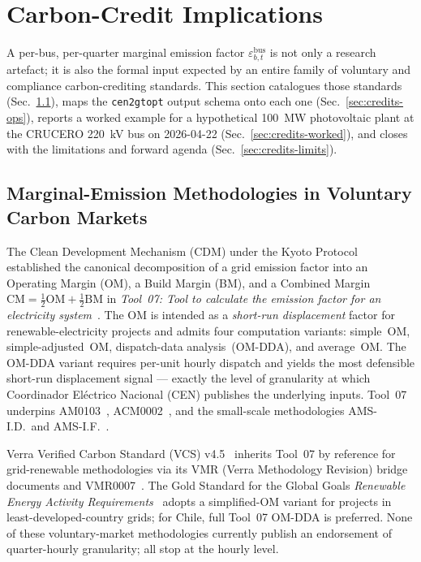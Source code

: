 \section{Carbon-Credit Implications}
\label{sec:credits}

A per-bus, per-quarter marginal emission factor
$\varepsilon^{\mathrm{bus}}_{b,t}$ is not only a research artefact; it
is also the formal input expected by an entire family of voluntary and
compliance carbon-crediting standards.  This section catalogues those
standards (Sec.~\ref{sec:credits-lit}), maps the
\texttt{cen2gtopt} output schema onto each one
(Sec.~\ref{sec:credits-ops}), reports a worked example for a
hypothetical 100~MW photovoltaic plant at the CRUCERO 220~kV bus on
2026-04-22 (Sec.~\ref{sec:credits-worked}), and closes with the
limitations and forward agenda
(Sec.~\ref{sec:credits-limits}).

\subsection{Marginal-Emission Methodologies in Voluntary Carbon Markets}
\label{sec:credits-lit}

The Clean Development Mechanism (CDM) under the Kyoto Protocol
established the canonical decomposition of a grid emission factor
into an Operating Margin (OM), a Build Margin (BM), and a Combined
Margin
$\mathrm{CM}=\tfrac{1}{2}\mathrm{OM}+\tfrac{1}{2}\mathrm{BM}$ in
\textit{Tool~07: Tool to calculate the emission factor for an
electricity system}~\cite{UNFCCCTool07}.  The OM is intended as a
\emph{short-run displacement} factor for renewable-electricity
projects and admits four computation variants: simple~OM,
simple-adjusted~OM, dispatch-data analysis~(OM-DDA), and average~OM.
The OM-DDA variant requires per-unit hourly dispatch and yields the
most defensible short-run displacement signal — exactly the level of
granularity at which Coordinador El\'ectrico Nacional (CEN)
publishes the underlying inputs.  Tool~07 underpins
AM0103~\cite{UNFCCCAM0103}, ACM0002~\cite{UNFCCCACM0002}, and the
small-scale methodologies AMS-I.D.\ and
AMS-I.F.~\cite{UNFCCCAMSID,UNFCCCAMSIF}.

Verra Verified Carbon Standard (VCS) v4.5~\cite{VerraVCS45}
inherits Tool~07 by reference for grid-renewable methodologies via
its VMR (Verra Methodology Revision) bridge documents and
VMR0007~\cite{VMR0007}.  The Gold Standard for the Global Goals
\textit{Renewable Energy Activity Requirements}~\cite{GSRENEAR}
adopts a simplified-OM variant for projects in least-developed-country
grids; for Chile, full Tool~07 OM-DDA is preferred.  None of these
voluntary-market methodologies currently publish an endorsement of
quarter-hourly granularity; all stop at the hourly level.

